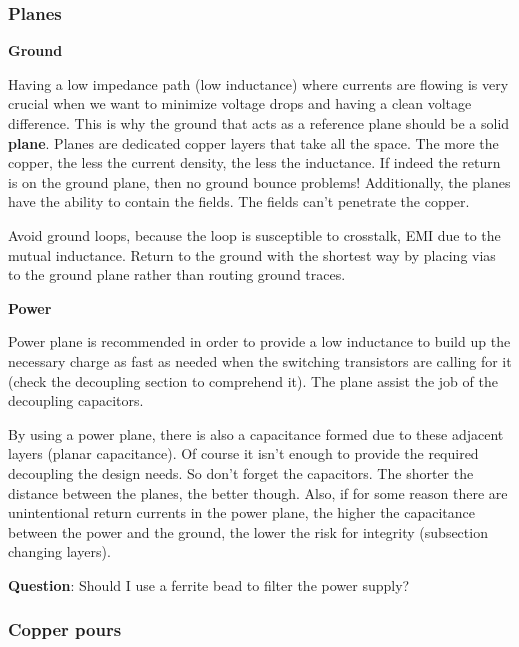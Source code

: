 \documentclass[final]{cubedoc}
\begin{document}
	\subsubsection{Planes}
	
	\textbf{Ground}
	
	Having a low impedance path (low inductance) where currents are flowing is very crucial when we want to minimize voltage drops and having a clean voltage difference. This is why the ground that acts as a reference plane should be a solid \textbf{plane}. Planes are dedicated copper layers that take all the space. The more the copper, the less the current density, the less the inductance. If indeed the return is on the ground plane, then no ground bounce problems! Additionally, the planes have the ability to contain the fields. The fields can't penetrate the copper.
	
	Avoid ground loops, because the loop is susceptible to crosstalk, EMI due to the mutual inductance. Return to the ground with the shortest way by placing vias to the ground plane rather than routing ground traces.
	
	\textbf{Power}
	
	Power plane is recommended in order to provide a low inductance to build up the necessary charge as fast as needed when the switching transistors are calling for it (check the decoupling section to comprehend it). The plane assist the job of the decoupling capacitors.
	
	By using a power plane, there is also a capacitance formed due to these adjacent layers (planar capacitance). Of course it isn't enough to provide the required decoupling the design needs. So don't forget the capacitors. The shorter the distance between the planes, the better though. Also, if for some reason there are unintentional return currents in the power plane, the higher the capacitance between the power and the ground, the lower the risk for integrity (subsection changing layers).
	
	
	
	\textbf{Question}: Should I use a ferrite bead to filter the power supply?
	
	\subsubsection{Copper pours}
	
\end{document}
